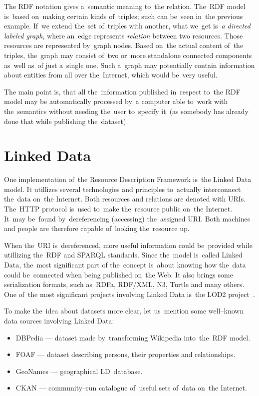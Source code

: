 The RDF notation gives a~semantic meaning to~the relation. The~RDF model is~based on~making certain
kinds of~triples; such can be~seen in~the previous example. If~we extend the~set of~triples with another,
what we~get is~\emph{a directed labeled graph}, where an~edge represents \emph{relation} between two resources.
Those resources are represented by~graph nodes. Based on~the actual content of~the triples,
the~graph may consist of~two or~more standalone connected components as~well as~of
just a~single one. Such a~graph may potentially contain information about entities from all over
the~Internet, which would be~very useful.

The main point is, that all the~information published in~respect to~the RDF model may be
automatically processed by~a computer able to~work with the~semantics without
needing the~user to~specify it~(as somebody has already done that while publishing the~dataset).

\section{Linked Data}

One implementation of~the Resource Description Framework is~the Linked Data model.
It utillizes several technologies and principles to~actually interconnect the~data on~the Internet.
Both resources and relations are denoted with URIs. The~HTTP protocol is~used to~make
the~resource public on~the Internet. It~may be~found by~dereferencing (accessing) the~assigned
URI. Both machines and people are therefore capable of~looking the~resource up.

When the~URI is~dereferenced, more useful information could be~provided while utillizing the~RDF
and SPARQL standards. Since the~model is~called Linked Data, the~most significant part
of the~concept is~about knowing how the~data could be~connected when being published on~the Web.
It also brings some serialization formats, such as~RDFa, RDF/XML, N3, Turtle and many others.
One of~the most significant projects involving Linked Data is~the LOD2 project~\cite{lod2}.

To make the~idea about datasets more clear, let us~mention some well--known data sources
involving Linked Data:

\begin{itemize}
\item DBPedia --- dataset made by~transforming Wikipedia into~the~RDF model.
\item FOAF --- dataset describing persons, their properties and relationships.
\item GeoNames --- geographical LD~database.
\item CKAN --- community--run catalogue of~useful sets of~data on~the Internet.
\end{itemize}

